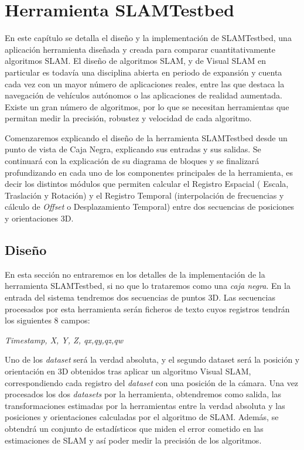 \newpage
\chapter{Herramienta SLAMTestbed} \label{cap:Herramienta SLAMTestbed} %
En este capítulo se detalla el diseño y la implementación de SLAMTestbed, una aplicación herramienta diseñada y creada para comparar cuantitativamente algoritmos SLAM. El diseño de algoritmos SLAM, y de Visual SLAM en particular es todavía una disciplina abierta en periodo de expansión y cuenta cada vez con un mayor número de aplicaciones reales, entre las que destaca la navegación de vehículos autónomos o las aplicaciones de realidad aumentada. Existe un gran número de algoritmos, por lo que se necesitan herramientas que  permitan medir la precisión, robustez y velocidad de cada algoritmo.

Comenzaremos explicando el diseño de la herramienta SLAMTestbed desde un punto de vista de Caja Negra, explicando sus entradas y sus salidas. Se continuará con la explicación de su diagrama de bloques y se finalizará profundizando en cada uno de los componentes principales de la herramienta, es decir los distintos módulos que permiten calcular el Registro Espacial ( Escala, Traslación y Rotación) y el Registro Temporal (interpolación de frecuencias y cálculo de \textit{Offset} o Desplazamiento Temporal) entre dos secuencias de posiciones y orientaciones 3D.

\section{Diseño}

En esta sección no entraremos en los detalles de la implementación de la herramienta SLAMTestbed, si no que lo trataremos como una \textit{caja negra}.
En la entrada del sistema tendremos dos secuencias de puntos 3D.
Las secuencias procesados por esta herramienta serán ficheros de texto cuyos registros tendrán los siguientes 8 campos:

\textit{Timestamp, X, Y, Z, qx,qy,qz,qw}

Uno de los \textit{dataset} será la verdad absoluta, y el segundo dataset será la posición y orientación en 3D obtenidos tras aplicar un algoritmo Visual SLAM, correspondiendo cada registro del \textit{dataset} con una posición de la cámara.
Una vez procesados los dos \textit{datasets} por la herramienta, obtendremos como salida, las transformaciones estimadas por la herramientas entre la verdad absoluta y las posiciones y orientaciones calculadas por el algoritmo de SLAM. Además, se obtendrá un conjunto de estadísticos que miden el error cometido en las estimaciones de SLAM y así poder medir la precisión de los algoritmos.


